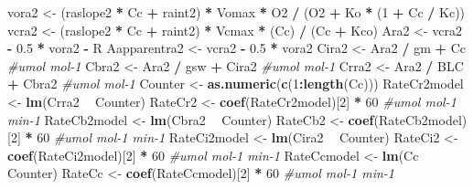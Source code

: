 \documentclass[
]{krantz}
\makeatletter
\newenvironment{Shaded}{\begin{snugshade}}{\end{snugshade}}
\newcommand{\CommentTok}[1]{\textcolor[rgb]{0.56,0.35,0.01}{\textit{#1}}}
\newcommand{\DecValTok}[1]{\textcolor[rgb]{0.00,0.00,0.81}{#1}}
\newcommand{\FloatTok}[1]{\textcolor[rgb]{0.00,0.00,0.81}{#1}}
\newcommand{\KeywordTok}[1]{\textcolor[rgb]{0.13,0.29,0.53}{\textbf{#1}}}
\newcommand{\NormalTok}[1]{#1}
\newcommand{\OperatorTok}[1]{\textcolor[rgb]{0.81,0.36,0.00}{\textbf{#1}}}
\newcommand{\StringTok}[1]{\textcolor[rgb]{0.31,0.60,0.02}{#1}}
\newenvironment{kframe}{%
\medskip{}
\setlength{\fboxsep}{.8em}
 \def\at@end@of@kframe{}%
 \ifinner\ifhmode%
  \def\at@end@of@kframe{\end{minipage}}%
  \begin{minipage}{\columnwidth}%
 \fi\fi%
 \def\FrameCommand##1{\hskip\@totalleftmargin \hskip-\fboxsep
 \colorbox{shadecolor}{##1}\hskip-\fboxsep
     \hskip-\linewidth \hskip-\@totalleftmargin \hskip\columnwidth}%
 \MakeFramed {\advance\hsize-\width
   \@totalleftmargin\z@ \linewidth\hsize
   \@setminipage}}%
 {\par\unskip\endMakeFramed%
 \at@end@of@kframe}
\renewenvironment{Shaded}{\begin{kframe}}{\end{kframe}}
\makeatother
\begin{document}
\begin{Shaded}
\begin{Highlighting}[]
{{\NormalTok{vora2 <-}
\StringTok{  }\NormalTok{(raslope2 }\OperatorTok{*}\StringTok{ }\NormalTok{Cc }\OperatorTok{+}\StringTok{ }\NormalTok{raint2) }\OperatorTok{*}\StringTok{ }\NormalTok{Vomax }\OperatorTok{*}\StringTok{ }\NormalTok{O2 }\OperatorTok{/}\StringTok{ }\NormalTok{(O2 }\OperatorTok{+}\StringTok{ }\NormalTok{Ko }\OperatorTok{*}\StringTok{ }\NormalTok{(}\DecValTok{1} \OperatorTok{+}\StringTok{ }\NormalTok{Cc }\OperatorTok{/}\StringTok{ }\NormalTok{Kc)) }
\NormalTok{vcra2 <-}\StringTok{ }\NormalTok{(raslope2 }\OperatorTok{*}\StringTok{ }\NormalTok{Cc }\OperatorTok{+}\StringTok{ }\NormalTok{raint2) }\OperatorTok{*}\StringTok{ }\NormalTok{Vcmax }\OperatorTok{*}\StringTok{ }\NormalTok{(Cc) }\OperatorTok{/}\StringTok{ }\NormalTok{(Cc }\OperatorTok{+}\StringTok{ }\NormalTok{Kco) }
\NormalTok{Ara2 <-}\StringTok{ }\NormalTok{vcra2 }\OperatorTok{-}\StringTok{ }\FloatTok{0.5} \OperatorTok{*}\StringTok{ }\NormalTok{vora2 }\OperatorTok{-}\StringTok{ }\NormalTok{R }
\NormalTok{Aapparentra2 <-}\StringTok{ }\NormalTok{vcra2 }\OperatorTok{-}\StringTok{ }\FloatTok{0.5} \OperatorTok{*}\StringTok{ }\NormalTok{vora2 }
\NormalTok{Cira2 <-}\StringTok{ }\NormalTok{Ara2 }\OperatorTok{/}\StringTok{ }\NormalTok{gm }\OperatorTok{+}\StringTok{ }\NormalTok{Cc }\CommentTok{#umol mol-1}
\NormalTok{Cbra2 <-}\StringTok{ }\NormalTok{Ara2 }\OperatorTok{/}\StringTok{ }\NormalTok{gsw }\OperatorTok{+}\StringTok{ }\NormalTok{Cira2 }\CommentTok{#umol mol-1}
\NormalTok{Crra2 <-}\StringTok{ }\NormalTok{Ara2 }\OperatorTok{/}\StringTok{ }\NormalTok{BLC }\OperatorTok{+}\StringTok{ }\NormalTok{Cbra2 }\CommentTok{#umol mol-1}
\NormalTok{Counter <-}\StringTok{ }\KeywordTok{as.numeric}\NormalTok{(}\KeywordTok{c}\NormalTok{(}\DecValTok{1}\OperatorTok{:}\KeywordTok{length}\NormalTok{(Cc)))}
\NormalTok{RateCr2model <-}\StringTok{ }\KeywordTok{lm}\NormalTok{(Crra2 }\OperatorTok{~}\StringTok{ }\NormalTok{Counter)}
\NormalTok{RateCr2 <-}\StringTok{ }\KeywordTok{coef}\NormalTok{(RateCr2model)[}\DecValTok{2}\NormalTok{] }\OperatorTok{*}\StringTok{ }\DecValTok{60} \CommentTok{#umol mol-1 min-1}
\NormalTok{RateCb2model <-}\StringTok{ }\KeywordTok{lm}\NormalTok{(Cbra2 }\OperatorTok{~}\StringTok{ }\NormalTok{Counter)}
\NormalTok{RateCb2 <-}\StringTok{ }\KeywordTok{coef}\NormalTok{(RateCb2model)[}\DecValTok{2}\NormalTok{] }\OperatorTok{*}\StringTok{ }\DecValTok{60} \CommentTok{#umol mol-1 min-1}
\NormalTok{RateCi2model <-}\StringTok{ }\KeywordTok{lm}\NormalTok{(Cira2 }\OperatorTok{~}\StringTok{ }\NormalTok{Counter)}
\NormalTok{RateCi2 <-}\StringTok{ }\KeywordTok{coef}\NormalTok{(RateCi2model)[}\DecValTok{2}\NormalTok{] }\OperatorTok{*}\StringTok{ }\DecValTok{60} \CommentTok{#umol mol-1 min-1}
\NormalTok{RateCcmodel <-}\StringTok{ }\KeywordTok{lm}\NormalTok{(Cc }\OperatorTok{~}\StringTok{ }\NormalTok{Counter)}
\NormalTok{RateCc <-}\StringTok{ }\KeywordTok{coef}\NormalTok{(RateCcmodel)[}\DecValTok{2}\NormalTok{] }\OperatorTok{*}\StringTok{ }\DecValTok{60} \CommentTok{#umol mol-1 min-1}

}}
\end{Highlighting}
\end{Shaded}
\end{document}
